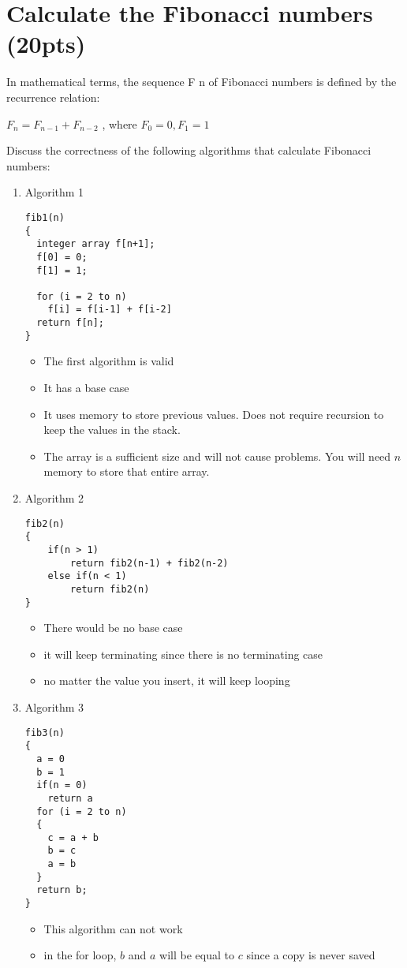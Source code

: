 \documentclass{article}[12pt]
\begin{document}
\newpage
\section{Calculate the Fibonacci numbers (20pts)}
In mathematical terms, the sequence F n of Fibonacci numbers is defined by the recurrence relation:


$F_n = F_{n-1} + F_{n-2}$ , where $F_0 = 0,F_1 = 1$ 


Discuss the correctness of the following algorithms that calculate Fibonacci numbers:
\begin{enumerate}
\item {Algorithm 1}
\begin{lstlisting}
fib1(n)
{
  integer array f[n+1];
  f[0] = 0;
  f[1] = 1;

  for (i = 2 to n)
    f[i] = f[i-1] + f[i-2]
  return f[n];
}
\end{lstlisting}
\begin{itemize}
  \item The first algorithm is valid
  \item It has a base case
  \item It uses memory to store previous values.
    Does not require recursion to keep the values in the stack.
  \item The array is a sufficient size and will not cause problems.
    You will need $n$ memory to store that entire array.
\end{itemize}
\item {Algorithm 2}
\begin{lstlisting}
fib2(n)
{
    if(n > 1)
        return fib2(n-1) + fib2(n-2)
    else if(n < 1)
        return fib2(n)
}
\end{lstlisting}
\begin{itemize}
  \item There would be no base case
  \item it will keep terminating since there is no terminating
    case
  \item no matter the value you insert, it will keep looping
\end{itemize}

\pagebreak
\item {Algorithm 3}
\begin{lstlisting}
fib3(n)
{
  a = 0 
  b = 1
  if(n = 0)
    return a
  for (i = 2 to n)
  {
	c = a + b
	b = c
	a = b
  }
  return b;
}
\end{lstlisting}
    \begin{itemize}
      \item This algorithm can not work
      \item in the for loop, $b$ and $a$ will be equal to $c$
        since a copy is never saved
    \end{itemize}

\end{enumerate}
\end{document}
